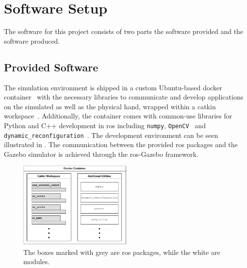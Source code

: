 \section{Software Setup}\label{sec:system-setup-software-setup}

The software for this project consists of two parts the software provided and the software produced.

\subsection{Provided Software}\label{sec:system-setup-simulation-setup-provided}

The simulation environment is shipped in a custom Ubuntu-based docker container~\cite{docker, ubuntu-docker-image} with the necessary libraries to communicate and develop applications on the simulated as well as the physical hand, wrapped within a catkin workspace~\cite{catkin}. Additionally, the container comes with common-use libraries for Python and C++ development in \gls{ros} including \texttt{numpy}\cite{numpy}, \texttt{OpenCV}~\cite{opencv} and \texttt{dynamic\_reconfiguration}~\cite{dynamic-reconfiguration}. The development environment can be seen illustrated in . The communication between the provided \gls{ros} packages and the Gazebo simulator is achieved through the \gls{ros}-Gazebo framework. 

\begin{figure}[!h]
	\begin{small}
		\begin{center}
			\includegraphics[width=0.5\textwidth]{chapters/system-setup/fig/init-package-diagram.pdf}
		\end{center}
		\caption{The boxes marked with grey are \gls{ros} packages, while the white are modules.}
		\label{fig:package-diagram}
	\end{small}
\end{figure}

